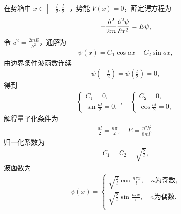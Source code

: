 在势箱中 $x \in \left[-\frac l2, \frac l2\right]$，势能 $V(x) = 0$，薛定谔方程为
\begin{align}
    -\frac{\hbar^2}{2m} \pdv[2]{\psi}{x} = E\psi,
\end{align}
令 $a^2 = \frac{2mE}{\hbar^2}$，通解为
\begin{align}
    \psi(x) = C_1 \cos ax + C_2 \sin ax,
\end{align}
由边界条件波函数连续
\begin{align}
    \psi\left(-\frac l2\right) = \psi\left(\frac l2\right) = 0,
\end{align}
得到
\begin{align}
    \begin{cases}
        C_1 = 0, \\
        \sin \frac{al}2 = 0,
    \end{cases}, \quad 
    \begin{cases}
        C_2 = 0, \\
        \cos \frac{al}2 = 0,
    \end{cases}
\end{align}
解得量子化条件为
\begin{align}
    \frac{al}2 = \frac{n\pi}2, \quad E = \frac{n^2h^2}{8 m l^2}.
\end{align}
归一化系数为
\begin{align}
    C_1 = C_2 = \sqrt{\frac2l},
\end{align}
波函数为
\begin{align}
    \psi(x) = \begin{cases}
        \sqrt{\frac2l} \cos\frac{n\pi x}l, \quad\text{$n$为奇数},\\
        \sqrt{\frac2l} \sin\frac{n\pi x}l, \quad\text{$n$为偶数}. \\
    \end{cases}
\end{align}


